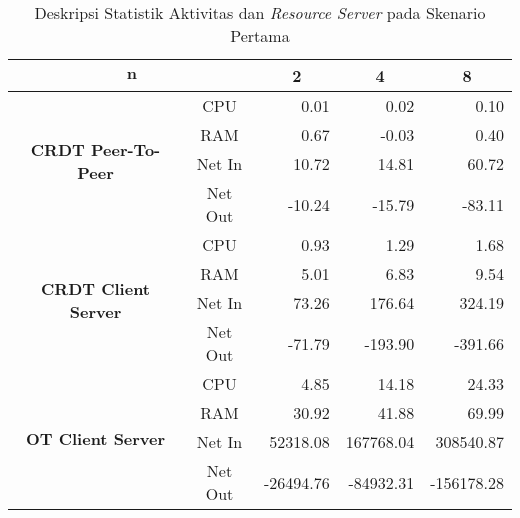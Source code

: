 \begin{table}[H]
 \centering

 \caption{Deskripsi Statistik Aktivitas dan \textit{Resource Server} pada Skenario Pertama}
\begin{tabular}{|cc|r|r|r|}
\hline
\multicolumn{2}{|c|}{$\boldsymbol{n}$} & \multicolumn{1}{c|}{\textbf{2}} & \multicolumn{1}{c|}{\textbf{4}} & \multicolumn{1}{c|}{\textbf{8}} \\ \hline
\multicolumn{1}{|c|}{\multirow{4}{*}{\textbf{CRDT Peer-To-Peer}}} & CPU & 0.01 & 0.02 & 0.10 \\ \cline{2-5}
\multicolumn{1}{|c|}{} & RAM & 0.67 & -0.03 & 0.40 \\ \cline{2-5}
\multicolumn{1}{|c|}{} & Net In & 10.72 & 14.81 & 60.72 \\ \cline{2-5}
\multicolumn{1}{|c|}{} & Net Out & -10.24 & -15.79 & -83.11 \\ \hline
\multicolumn{1}{|c|}{\multirow{4}{*}{\textbf{CRDT Client Server}}} & CPU & 0.93 & 1.29 & 1.68 \\ \cline{2-5}
\multicolumn{1}{|c|}{} & RAM & 5.01 & 6.83 & 9.54 \\ \cline{2-5}
\multicolumn{1}{|c|}{} & Net In & 73.26 & 176.64 & 324.19 \\ \cline{2-5}
\multicolumn{1}{|c|}{} & Net Out & -71.79 & -193.90 & -391.66 \\ \hline
\multicolumn{1}{|c|}{\multirow{4}{*}{\textbf{OT Client Server}}} & CPU & 4.85 & 14.18 & 24.33 \\ \cline{2-5}
\multicolumn{1}{|c|}{} & RAM & 30.92 & 41.88 & 69.99 \\ \cline{2-5}
\multicolumn{1}{|c|}{} & Net In & 52318.08 & 167768.04 & 308540.87 \\ \cline{2-5}
\multicolumn{1}{|c|}{} & Net Out & -26494.76 & -84932.31 & -156178.28 \\ \hline
\end{tabular}
\end{table}

